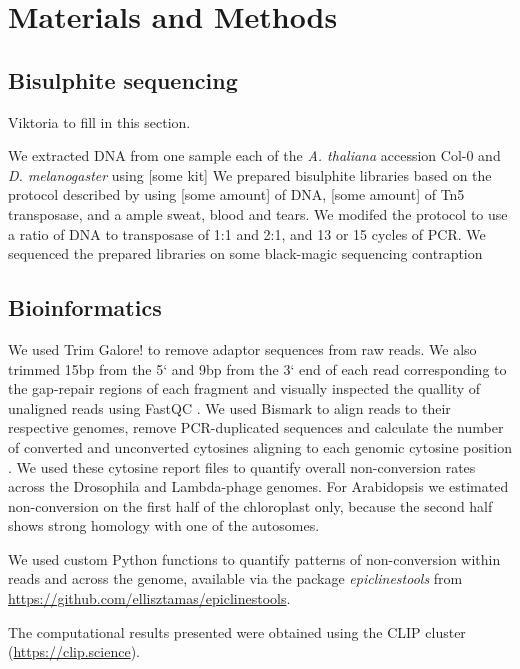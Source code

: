 \documentclass[12pt,longbibliography]{article}
\begin{document}
\section{Materials and Methods}

\subsection{Bisulphite sequencing}

Viktoria to fill in this section.

We extracted DNA from one sample each of the \textit{A. thaliana} accession Col-0 and \textit{D. melanogaster} using [some kit]
We prepared bisulphite libraries based on the protocol described by \textcite{weichenhan2018tagmentation} using [some amount] of DNA, [some amount] of Tn5 transposase, and a ample sweat, blood and tears.
We modifed the protocol to use a ratio of DNA to transposase of 1:1 and 2:1, and 13 or 15 cycles of PCR.
We sequenced the prepared libraries on some black-magic sequencing contraption

\subsection{Bioinformatics}

We used Trim Galore! to remove adaptor sequences from raw reads. We also trimmed 15bp from the 5` and 9bp from the 3` end of each read corresponding to the gap-repair regions of each fragment \parencite{krueger2015trim} and visually inspected the quallity of unaligned reads using FastQC \parencite{andrews2020fastqc}.
We used Bismark to align reads to their respective genomes, remove PCR-duplicated sequences and calculate the number of converted and unconverted cytosines aligning to each genomic cytosine position \parencite{krueger2011bismark}.
We used these cytosine report files to quantify overall non-conversion rates across the Drosophila and Lambda-phage genomes.
For Arabidopsis we estimated non-conversion on the first half of the chloroplast only, because the second half shows strong homology with one of the autosomes.

We used custom Python functions to quantify patterns of non-conversion within reads and across the genome, available via the package \textit{epiclinestools} from \url{https://github.com/ellisztamas/epiclinestools}.

The computational results presented were obtained using the CLIP cluster (\url{https://clip.science}).
\end{document}
